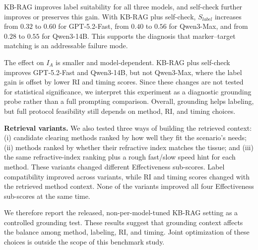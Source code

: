 \documentclass[conference]{IEEEtran}
\begin{document}
KB-RAG improves label suitability for all three models, and self-check further
improves or preserves this gain. With KB-RAG plus self-check, $S_{label}$
increases from $0.32$ to $0.60$ for GPT-5.2-Fast, from $0.40$ to $0.56$ for
Qwen3-Max, and from $0.28$ to $0.55$ for Qwen3-14B. This supports the diagnosis
that marker--target matching is an addressable failure mode.

The effect on $I_A$ is smaller and model-dependent. KB-RAG plus self-check
improves GPT-5.2-Fast and Qwen3-14B, but not Qwen3-Max, where the label gain is
offset by lower RI and timing scores. Since these changes are not tested for
statistical significance, we interpret this experiment as a diagnostic grounding
probe rather than a full prompting comparison. Overall, grounding helps labeling,
but full protocol feasibility still depends on method, RI, and timing choices.

\noindent\textbf{Retrieval variants.}
We also tested three ways of building the retrieved context: (i) candidate
clearing methods ranked by how well they fit the scenario's needs; (ii) methods
ranked by whether their refractive index matches the tissue; and (iii) the same
refractive-index ranking plus a rough fast/slow speed hint for each method.
These variants changed different Effectiveness sub-scores. Label compatibility
improved across variants, while RI and timing scores changed with the retrieved
method context. None of the variants improved all four Effectiveness sub-scores
at the same time.

We therefore report the released, non-per-model-tuned KB-RAG setting as a
controlled grounding test. These results suggest that grounding context affects
the balance among method, labeling, RI, and timing. Joint optimization of these
choices is outside the scope of this benchmark study.
\end{document}
